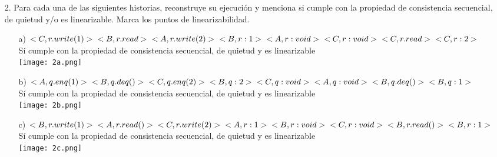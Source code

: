 \documentclass[12pt, letterpaper]{article}
\begin{document}
\begin{itemize}
\begin{itemize}
\end{itemize}
\item[2. ] Para cada una de las siguientes historias, reconstruye su ejecución y menciona
si cumple con la propiedad de consistencia secuencial, de quietud y/o es
linearizable. Marca los puntos de linearizabilidad.
\begin{itemize}
\item[a)]
$
<C, r.write(1)>\\
<B, r.read>\\
<A, r.write(2)>\\
<B, r: 1>\\
<A, r: void>\\
<C, r: void>\\
<C, r.read>\\
<C, r: 2>
$\\
Sí cumple con la propiedad de consistencia secuencial, de quietud y es linearizable\\
\texttt{[image: 2a.png]}\\
\item[b)]
$
<A, q.enq(1)>\\
<B, q.deq()>\\
<C, q.enq(2)>\\
<B, q: 2>\\
<C, q: void>\\
<A, q: void>\\
<B, q.deq()>\\
<B, q: 1>
$\\
Sí cumple con la propiedad de consistencia secuencial, de quietud y es linearizable\\
\texttt{[image: 2b.png]}\\
\item[c)]
$
<B, r.write(1)>\\
<A, r.read()>\\
<C, r.write(2)>\\
<A, r: 1>\\
<B, r: void>\\
<C, r: void>\\
<B, r.read()>\\
<B, r: 1>
$\\
Sí cumple con la propiedad de consistencia secuencial, de quietud y es linearizable\\
\texttt{[image: 2c.png]}\\
\end{itemize} 


\end{itemize}
\end{document}
